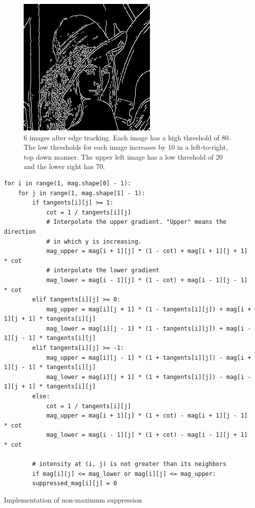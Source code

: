 \documentclass{ee208report}
\begin{document}
\begin{figure}[H]
    \includegraphics[width=0.35\linewidth]{images/low_threshold/70.png}
    \caption{6 images after edge tracking. Each image has a high threshold of
    80. The low thresholds for each image increases by 10 in a left-to-right,
    top down manner. The upper left image has a low threshold of 20 and the
    lower right has 70.}
    \label{fig:low-t}
\end{figure}

\begin{listing}
    \begin{verbatim}
for i in range(1, mag.shape[0] - 1):
    for j in range(1, mag.shape[1] - 1):
        if tangents[i][j] >= 1:
            cot = 1 / tangents[i][j]
            # Interpolate the upper gradient. "Upper" means the direction
            # in which y is increasing.
            mag_upper = mag[i + 1][j] * (1 - cot) + mag[i + 1][j + 1] * cot
            # interpolate the lower gradient
            mag_lower = mag[i - 1][j] * (1 - cot) + mag[i - 1][j - 1] * cot
        elif tangents[i][j] >= 0:
            mag_upper = mag[i][j + 1] * (1 - tangents[i][j]) + mag[i + 1][j + 1] * tangents[i][j]
            mag_lower = mag[i][j - 1] * (1 - tangents[i][j]) + mag[i - 1][j - 1] * tangents[i][j]
        elif tangents[i][j] >= -1:
            mag_upper = mag[i][j - 1] * (1 + tangents[i][j]) - mag[i + 1][j - 1] * tangents[i][j]
            mag_lower = mag[i][j + 1] * (1 + tangents[i][j]) - mag[i - 1][j + 1] * tangents[i][j]
        else:
            cot = 1 / tangents[i][j]
            mag_upper = mag[i + 1][j] * (1 + cot) - mag[i + 1][j - 1] * cot
            mag_lower = mag[i - 1][j] * (1 + cot) - mag[i - 1][j + 1] * cot

        # intensity at (i, j) is not greater than its neighbors
        if mag[i][j] <= mag_lower or mag[i][j] <= mag_upper:
        suppressed_mag[i][j] = 0
    \end{verbatim}
    \caption{Implementation of non-maximum suppression}
    \label{lst:non-max-sup}
\end{listing}
\end{document}
